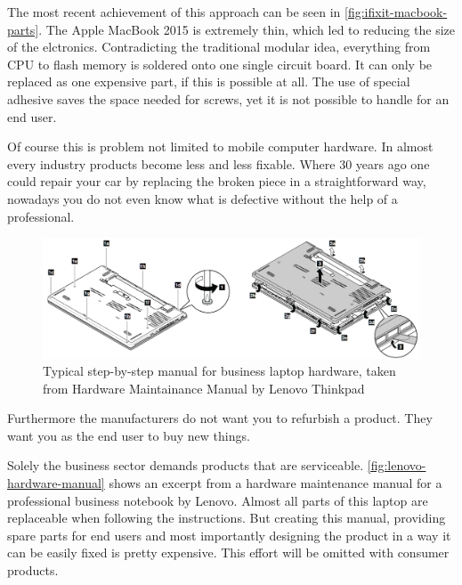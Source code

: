 	The most recent achievement of this approach can be seen in \autoref{fig:ifixit-macbook-parts}. The Apple MacBook 2015 is extremely thin, which led to reducing the size of the elctronics. Contradicting the traditional modular idea, everything from CPU to flash memory is soldered onto one single circuit board. It can only be replaced as one expensive part, if this is possible at all. The use of special adhesive saves the space needed for screws, yet it is not possible to handle for an end user.
	
	Of course this is problem not limited to mobile computer hardware. In almost every industry products become less and less fixable. Where 30 years ago one could repair your car by replacing the broken piece in a straightforward way, nowadays you do not even know what is defective without the help of a professional.
	
	\begin{figure}[H]
		\includegraphics[width=\textwidth]{../images/common-manual.png}
		\centering
		\caption[Typical step-by-step manual for business laptop hardware, taken from Hardware Maintainance Manual by Lenovo Thinkpad]{Typical step-by-step manual for business laptop hardware, taken from Hardware Maintainance Manual by Lenovo Thinkpad\footnotemark}
		\label{fig:lenovo-hardware-manual}
	\end{figure}
	
	Furthermore the manufacturers do not want you to refurbish a product. They want you as the end user to buy new things.
	
	Solely the business sector demands products that are serviceable. \autoref{fig:lenovo-hardware-manual} shows an excerpt from a hardware maintenance manual for a professional business notebook by Lenovo. Almost all parts of this laptop are replaceable when following the instructions. But creating this manual, providing spare parts for end users and most importantly designing the product in a way it can be easily fixed is pretty expensive. This effort will be omitted with consumer products.
	
